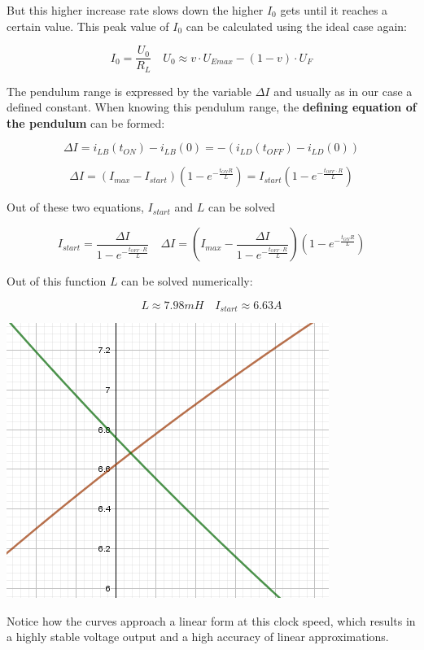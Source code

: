 \documentclass{article}
\begin{document}
    But this higher increase rate slows down the higher $I_0$ gets until it reaches a certain value. This peak value of $I_0$ can be calculated using the ideal case again: 
    
    \begin{equation}
        I_0 = \frac{U_0}{R_L} \quad U_0 \approx v \cdot U_{Emax} - (1 - v) \cdot U_F
    \end{equation}
    
    The pendulum range is expressed by the variable $\Delta I$ and usually as in our case a defined constant. When knowing this pendulum range, the \textbf{defining equation of the pendulum} can be formed:
    
    \begin{equation}
        \Delta I = i_{LB}(t_{ON}) - i_{LB}(0) = - (i_{LD}(t_{OFF}) - i_{LD}(0))
    \end{equation}
    
    \begin{equation}
        \Delta I = (I_{max} - I_{start})(1 - e^{-\frac{t_{ON} R}{L}}) = I_{start}(1 - e^{-\frac{t_{OFF}\cdot R}{L}}) 
    \end{equation}
    
    Out of these two equations, $I_{start}$ and $L$ can be solved
    
    \begin{equation}
        I_{start} = \frac{\Delta I}{1 - e^{-\frac{t_{OFF}\cdot R}{L}}} \quad \Delta I= (I_{max} - \frac{\Delta I}{1 - e^{-\frac{t_{OFF}\cdot R}{L}}})(1 - e^{-\frac{t_{ON} R}{L}})
    \end{equation}
    
    Out of this function $L$ can be solved numerically: 
        
    \[
        L \approx 7.98mH \quad I_{start} \approx 6.63A
    \]
    
    \begin{center}
        \includegraphics[scale=0.75]{images/CurrentPendulum.PNG}
    \end{center}
    
    Notice how the curves approach a linear form at this clock speed, which results in a highly stable voltage output and a high accuracy of linear approximations. 
        
\end{document}
